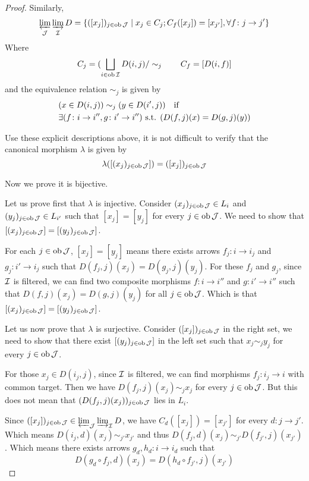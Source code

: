 \begin{proof}
    Similarly,
    \begin{equation*}
      \operatorname*{\underleftarrow{\lim}}_{{\cal J}}\operatorname*{\underrightarrow{\lim}}_{{\cal I}} D = \{([x_j])_{j\in\operatorname{ob}{\cal J}}\mid x_j\in C_j; C_f([x_j])=[x_{j'}], \forall f\colon j\to j'\}
    \end{equation*}
    Where
    \begin{equation*}
      C_j = (\bigsqcup_{i\in\operatorname{ob}{\cal I}} D(i,j)/\sim_j\qquad C_f = [D(i,f)]
    \end{equation*}
    and the equivalence relation $\sim_j$ is given by
    \begin{align*}
      &(x\in D(i,j))\sim_j(y\in D(i',j))\quad \text{if}\\
      &\exists(f\colon i\to i'',g\colon i'\to i'')\textrm{ s.t. }(D(f,j)(x)=D(g,j)(y))
    \end{align*}

    Use these explicit descriptions above, it is not difficult to verify that the canonical morphism $\lambda$ is given by
    \begin{equation*}
      \lambda([(x_j)_{j\in\operatorname{ob}{\cal J}}]) = ([x_j])_{j\in\operatorname{ob}{\cal J}}
    \end{equation*}

    Now we prove it is bijective.

    Let us prove first that $\lambda$ is injective. Consider $(x_j)_{j\in\operatorname{ob}{\cal J}}\in L_i$ and $(y_j)_{j\in\operatorname{ob}{\cal J}}\in L_{i'}$ such that $[x_j]=[y_j]$ for every $j\in\operatorname{ob}{\cal J}$. We need to show that $[(x_j)_{j\in\operatorname{ob}{\cal J}}]=[(y_j)_{j\in\operatorname{ob}{\cal J}}]$.

    For each $j\in\operatorname{ob}{\cal J}$, $[x_j]=[y_j]$ means there exists arrows $f_j\colon i\to i_j$ and $g_j\colon i'\to i_j$ such that $D(f_j,j)(x_j)=D(g_j,j)(y_j)$. For these $f_j$ and $g_j$, since ${\cal I}$ is filtered, we can find two composite morphisms $f\colon i\to i''$ and $g\colon i'\to i''$ such that $D(f,j)(x_j)=D(g,j)(y_j)$ for all $j\in\operatorname{ob}{\cal J}$. Which is that $[(x_j)_{j\in\operatorname{ob}{\cal J}}]=[(y_j)_{j\in\operatorname{ob}{\cal J}}]$.

    Let us now prove that $\lambda$ is surjective. Consider $([x_j])_{j\in\operatorname{ob}{\cal J}}$ in the right set, we need to show that there exist $[(y_j)_{j\in\operatorname{ob}{\cal J}}]$ in the left set such that $x_j\sim_jy_j$ for every $j\in\operatorname{ob}{\cal J}$.

    For those $x_j\in D(i_j,j)$, since ${\cal I}$ is filtered, we can find morphisms $f_j\colon i_j\to i$ with common target. Then we have $D(f_j,j)(x_j)\sim_jx_j$ for every $j\in\operatorname{ob}{\cal J}$. But this does not mean that $(D(f_j,j)(x_j))_{j\in\operatorname{ob}{\cal J}}$ lies in $L_i$.

    Since $([x_j])_{j\in\operatorname{ob}{\cal J}}\in\operatorname*{\underleftarrow{\lim}}_{{\cal J}}\operatorname*{\underrightarrow{\lim}}_{{\cal I}} D$, we have $C_d([x_j])=[x_{j'}]$ for every $d\colon j\to j'$. Which means $D(i_j,d)(x_j)\sim_{j'}x_{j'}$ and thus $D(f_j,d)(x_j)\sim_{j'}D(f_{j'},j)(x_{j'})$. Which means there exists arrows $g_d,h_d\colon i\to i_d$ such that
    \begin{equation*}
      D(g_d\circ f_j,d)(x_j) = D(h_d\circ f_{j'},j)(x_{j'})
    \end{equation*}


\end{proof}
